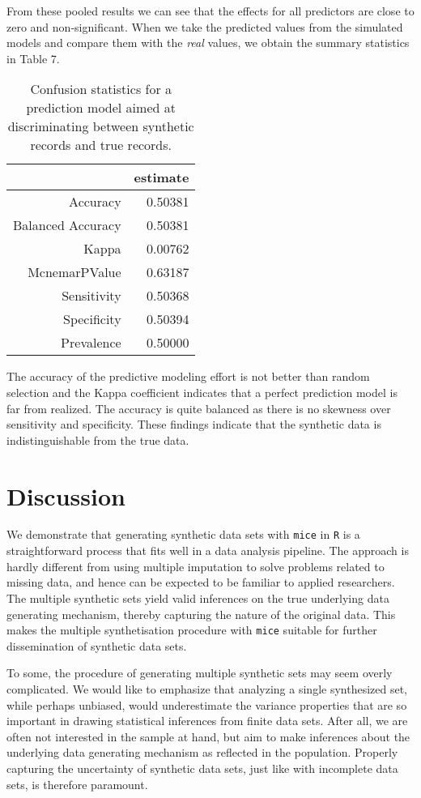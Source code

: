 \documentclass[psych,article,submit,moreauthors,pdftex]{mdpi}
\begin{document}
From these pooled results we can see that the effects for all predictors
are close to zero and non-significant. When we take the predicted values
from the simulated models and compare them with the \emph{real} values,
we obtain the summary statistics in Table 7.

\begin{table}[H]
\caption{Confusion statistics for a prediction model aimed at discriminating between synthetic records and true records.}
\centering
\begin{tabular}{rr}
  \hline
& estimate\\
  \hline
 Accuracy & 0.50381 \\
 Balanced Accuracy & 0.50381 \\
 Kappa & 0.00762 \\
 McnemarPValue & 0.63187 \\
 Sensitivity & 0.50368 \\
 Specificity & 0.50394 \\
 Prevalence & 0.50000 \\
   \hline
\end{tabular}
\end{table}

The accuracy of the predictive modeling effort is not better than random
selection and the Kappa coefficient indicates that a perfect prediction
model is far from realized. The accuracy is quite balanced as there is
no skewness over sensitivity and specificity. These findings indicate
that the synthetic data is indistinguishable from the true data.

\hypertarget{discussion}{%
\section{Discussion}\label{discussion}}

We demonstrate that generating synthetic data sets with \texttt{mice} in
\texttt{R} is a straightforward process that fits well in a data
analysis pipeline. The approach is hardly different from using multiple
imputation to solve problems related to missing data, and hence can be
expected to be familiar to applied researchers. The multiple synthetic
sets yield valid inferences on the true underlying data generating
mechanism, thereby capturing the nature of the original data. This makes
the multiple synthetisation procedure with \texttt{mice} suitable for
further dissemination of synthetic data sets.

To some, the procedure of generating multiple synthetic sets may seem
overly complicated. We would like to emphasize that analyzing a single
synthesized set, while perhaps unbiased, would underestimate the
variance properties that are so important in drawing statistical
inferences from finite data sets. After all, we are often not interested
in the sample at hand, but aim to make inferences about the underlying
data generating mechanism as reflected in the population. Properly
capturing the uncertainty of synthetic data sets, just like with
incomplete data sets, is therefore paramount.
\end{document}
